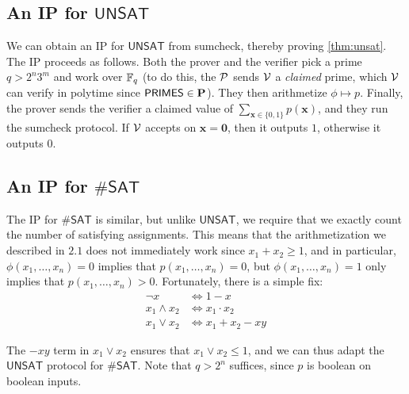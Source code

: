\subsection{An IP for $\mathsf{UNSAT}$}

We can obtain an IP for $\mathsf{UNSAT}$ from sumcheck, thereby proving \ref{thm:unsat}. The IP proceeds as follows. Both the prover and the verifier pick a prime $q>2^n3^m$ and work over $\mathbb{F}_q$ (to do this, the $\mathcal{P}$ sends $\mathcal{V}$ a \textit{claimed} prime, which $\mathcal{V}$ can verify in polytime since $\mathsf{PRIMES}\in\mathbf{P}$). They then arithmetize $\phi\mapsto p$. Finally, the prover sends the verifier a claimed value of $\sum_{\mathbf{x}\in\{0,1\}}p(\mathbf{x})$, and they run the sumcheck protocol. If $\mathcal{V}$ accepts on $\mathbf{x}=\mathbf{0}$, then it outputs $1$, otherwise it outputs $0$.

\subsection{An IP for $\#\mathsf{SAT}$}

The IP for $\#\mathsf{SAT}$ is similar, but unlike $\mathsf{UNSAT}$, we require that we exactly count the number of satisfying assignments. This means that the arithmetization we described in $2.1$ does not immediately work since $x_1+x_2\geq1$, and in particular, $\phi(x_1,\dots, x_n)=0$ implies that $p(x_1,\dots,x_n)=0$, but $\phi(x_1,\dots, x_n)=1$ only implies that $p(x_1,\dots,x_n)>0$. Fortunately, there is a simple fix:
\begin{align*}
	\neg x&\Leftrightarrow 1-x\\
	x_1\wedge x_2&\Leftrightarrow x_1\cdot x_2\\
	x_1\vee x_2&\Leftrightarrow x_1+x_2-xy
\end{align*}

The $-xy$ term in $x_1\vee x_2$ ensures that $x_1\vee x_2\leq 1$, and we can thus adapt the $\mathsf{UNSAT}$ protocol for $\#\mathsf{SAT}$. Note that $q>2^n$ suffices, since $p$ is boolean on boolean inputs.